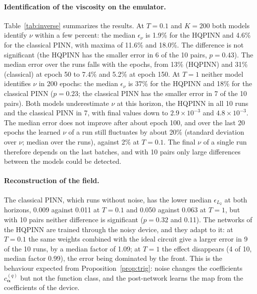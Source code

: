 \documentclass[floatfix,aps,pra,twocolumn,superscriptaddress,10pt,nofootinbib]{revtex4-2}
\begin{document}
\paragraph{Identification of the viscosity on the emulator.} Table~\ref{tab:inverse} summarizes the results. At $T=0.1$ and $K=200$ both models identify $\nu$ within a few percent: the median $\epsilon_\nu$ is 1.9\% for the HQPINN and 4.6\% for the classical PINN, with maxima of 11.6\% and 18.0\%. The difference is not significant (the HQPINN has the smaller error in 6 of the 10 pairs, $p=0.43$). The median error over the runs falls with the epochs, from 13\% (HQPINN) and 31\% (classical) at epoch 50 to 7.4\% and 5.2\% at epoch 150. At $T=1$ neither model identifies $\nu$ in 200 epochs: the median $\epsilon_\nu$ is 37\% for the HQPINN and 18\% for the classical PINN ($p=0.23$; the classical PINN has the smaller error in 7 of the 10 pairs). Both models underestimate $\nu$ at this horizon, the HQPINN in all 10 runs and the classical PINN in 7, with final values down to $2.9\times10^{-3}$ and $4.8\times10^{-3}$. The median error does not improve after about epoch 100, and over the last 20 epochs the learned $\nu$ of a run still fluctuates by about 20\% (standard deviation over $\nu$; median over the runs), against 2\% at $T=0.1$. The final $\nu$ of a single run therefore depends on the last batches, and with 10 pairs only large differences between the models could be detected.

\paragraph{Reconstruction of the field.} The classical PINN, which runs without noise, has the lower median $\epsilon_{L_2}$ at both horizons, 0.009 against 0.011 at $T=0.1$ and 0.050 against 0.063 at $T=1$, but with 10 pairs neither difference is significant ($p=0.32$ and 0.11). The networks of the HQPINN are trained through the noisy device, and they adapt to it: at $T=0.1$ the same weights combined with the ideal circuit give a larger error in 9 of the 10 runs, by a median factor of 1.09; at $T=1$ the effect disappears (4 of 10, median factor 0.99), the error being dominated by the front. This is the behaviour expected from Proposition~\ref{prop:trig}: noise changes the coefficients $c^{(q)}_{\bm\alpha}$ but not the function class, and the post-network learns the map from the coefficients of the device.
\end{document}
